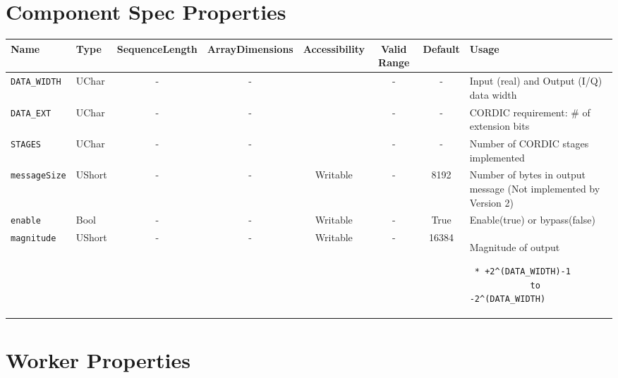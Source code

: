 \documentclass{article}
\begin{document}
\begin{landscape}
\section*{Component Spec Properties}
\begin{scriptsize}
	\begin{tabular}{|p{3cm}|p{1.5cm}|c|c|c|c|c|p{7cm}|}
		\hline
		\rowcolor{blue}
		Name               & Type   & SequenceLength & ArrayDimensions & Accessibility      & Valid Range & Default & Usage                                                               \\
		\hline
		\verb+DATA_WIDTH+  & UChar  & -              & -               &          & -           & -       & Input (real) and Output (I/Q) data width                            \\
		\hline
		\verb+DATA_EXT+    & UChar  & -              & -               &          & -           & -       & CORDIC requirement: \# of extension bits                            \\
		\hline
		\verb+STAGES+      & UChar  & -              & -               &          & -           & -       & Number of CORDIC stages implemented                                 \\
		\hline
		\verb+messageSize+ & UShort & -              & -               & Writable & -           & 8192    & Number of bytes in output message (Not implemented by Version 2) \\
		\hline
		\verb+enable+      & Bool   & -              & -               & Writable & -           & True    & Enable(true) or bypass(false)                                       \\
		\hline
		\verb+magnitude+   & UShort & -              & -               & Writable & -           & 16384   & Magnitude of output \scriptsize\begin{verbatim} * +2^(DATA_WIDTH)-1
			to -2^(DATA_WIDTH)\end{verbatim}\\
		\hline
	\end{tabular}
\end{scriptsize}

\section*{Worker Properties}

\end{landscape}
\end{document}
